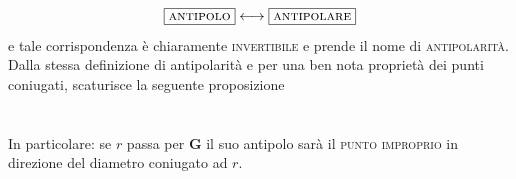\begin{equation*}
\boxed{\textup{\textsc{antipolo}}} \longleftrightarrow \boxed{\textup{\textsc{antipolare}}}
\end{equation*}
e tale corrispondenza è chiaramente \textsc{invertibile} e prende il nome di \textsc{antipolarità}. 
\noindent Dalla stessa definizione di antipolarità e per una ben nota proprietà dei punti coniugati, scaturisce la seguente proposizione 
\\

\\
\\

\noindent In particolare: se $r$ passa per $\mathbf{G}$ il suo antipolo sarà il \textsc{punto improprio} in direzione del diametro coniugato ad $r$. 

